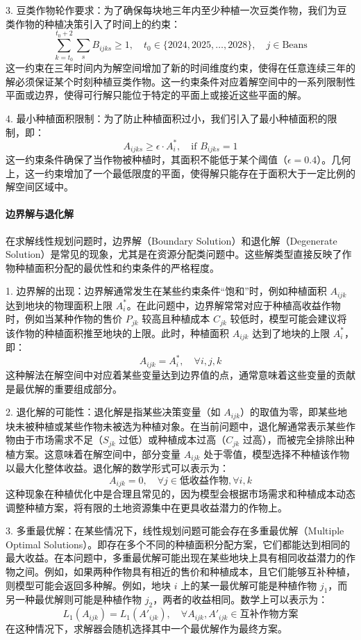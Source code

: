 \documentclass[12pt,a4paper]{nmmcm}
\begin{document}
3. 豆类作物轮作要求：为了确保每块地三年内至少种植一次豆类作物，我们为豆类作物的种植决策引入了时间上的约束：
\[
  \sum_{k=t_0}^{t_0+2} \sum_s B_{ijks} \geq 1, \quad t_0 \in \{2024, 2025, \dots, 2028\}, \quad j \in \text{Beans}
\]
这一约束在三年时间内为解空间增加了新的时间维度约束，使得在任意连续三年的解必须保证某个时刻种植豆类作物。这一约束条件对应着解空间中的一系列限制性平面或边界，使得可行解只能位于特定的平面上或接近这些平面的解。

4. 最小种植面积限制：为了防止种植面积过小，我们引入了最小种植面积的限制，即：
\[
  A_{ijks} \geq \epsilon \cdot A_i^*, \quad \text{if } B_{ijks} = 1
\]
这一约束条件确保了当作物被种植时，其面积不能低于某个阈值（$\epsilon = 0.4$）。几何上，这一约束增加了一个最低限度的平面，使得解只能存在于面积大于一定比例的解空间区域中。

\paragraph{边界解与退化解}

在求解线性规划问题时，边界解（Boundary Solution）和退化解（Degenerate Solution）是常见的现象，尤其是在资源分配类问题中。这些解类型直接反映了作物种植面积分配的最优性和约束条件的严格程度。

1. 边界解的出现：边界解通常发生在某些约束条件“饱和”时，例如种植面积 $A_{ijk}$ 达到地块的物理面积上限 $A_i^*$。在此问题中，边界解常常对应于种植高收益作物时，例如当某种作物的售价 $P_{jk}$ 较高且种植成本 $C_{jk}$ 较低时，模型可能会建议将该作物的种植面积推至地块的上限。此时，种植面积 $A_{ijk}$ 达到了地块的上限 $A_i^*$，即：
\[
  A_{ijk} = A_i^*, \quad \forall i, j, k
\]
这种解法在解空间中对应着某些变量达到边界值的点，通常意味着这些变量的贡献是最优解的重要组成部分。

2. 退化解的可能性：退化解是指某些决策变量（如 $A_{ijk}$）的取值为零，即某些地块未被种植或某些作物未被选为种植对象。在当前问题中，退化解通常表示某些作物由于市场需求不足（$S_{jk}$ 过低）或种植成本过高（$C_{jk}$ 过高），而被完全排除出种植方案。这意味着在解空间中，部分变量 $A_{ijk}$ 处于零值，模型选择不种植该作物以最大化整体收益。退化解的数学形式可以表示为：
\[
  A_{ijk} = 0, \quad \forall j \in \text{低收益作物}, \forall i, k
\]
这种现象在种植优化中是合理且常见的，因为模型会根据市场需求和种植成本动态调整种植方案，将有限的土地资源集中在更具收益潜力的作物上。

3. 多重最优解：在某些情况下，线性规划问题可能会存在多重最优解（Multiple Optimal Solutions）。即存在多个不同的种植面积分配方案，它们都能达到相同的最大收益。在本问题中，多重最优解可能出现在某些地块上具有相同收益潜力的作物之间。例如，如果两种作物具有相近的售价和种植成本，且它们能够互补种植，则模型可能会返回多种解。例如，地块 $i$ 上的某一最优解可能是种植作物 $j_1$，而另一种最优解则可能是种植作物 $j_2$，两者的收益相同。数学上可以表示为：
\[
  L_1(A_{ijk}) = L_1(A'_{ijk}), \quad \forall A_{ijk}, A'_{ijk} \in \text{互补作物方案}
\]
在这种情况下，求解器会随机选择其中一个最优解作为最终方案。
\end{document}
